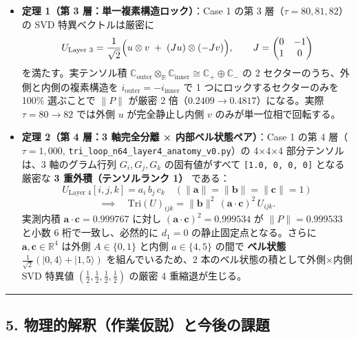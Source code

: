 \documentclass[
  a4paper,
]{ltjsarticle}
\providecommand{\tightlist}{%
  \setlength{\itemsep}{0pt}\setlength{\parskip}{0pt}}
\begin{document}
\begin{itemize}
\tightlist
\item
  \textbf{定理 1（第 3 層：単一複素構造ロック）}：Case 1 の第 3
  層（\(\tau = 80, 81, 82\)）の SVD 特異ベクトルは厳密に
  \[U_{\text{Layer 3}} = \frac{1}{\sqrt{2}}\Bigl( u \otimes v \;+\; (J u) \otimes (-J v) \Bigr), \qquad J = \begin{pmatrix} 0 & -1 \\ 1 & 0 \end{pmatrix}\]
  を満たす。実テンソル積
  \(\mathbb{C}_{\mathrm{outer}} \otimes_{\mathbb{R}} \mathbb{C}_{\mathrm{inner}} \cong \mathbb{C}_{+} \oplus \mathbb{C}_{-}\)
  の 2 セクターのうち、外側と内側の複素構造を
  \(i_{\mathrm{outer}} = -i_{\mathrm{inner}}\) で 1
  つにロックするセクターのみを 100\% 選ぶことで \(\|P\|\) が厳密 2
  倍（\(0.2409 \to 0.4817\)）になる。実際 \(\tau = 80 \to 82\) では外側
  \(u\) が完全静止し内側 \(v\) のみが単一位相で回転する。
\item
  \textbf{定理 2（第 4 層：3 軸完全分離 × 内部ベル状態ペア）}：Case 1
  の第 4 層（\(\tau = 1,000\),
  \texttt{tri\_\allowbreak{}loop\_\allowbreak{}n64\_\allowbreak{}layer4\_\allowbreak{}anatomy\_\allowbreak{}v0.py}）の 4×4×4
  部分テンソルは、3 軸のグラム行列 \(G_i, G_j, G_k\) の固有値がすべて
  \texttt{{[}1.0,\ 0,\ 0,\ 0{]}} となる厳密な \textbf{3
  重外積（テンソルランク 1）} である：
  \[U_{\text{Layer 4}}[i, j, k] = a_i \, b_j \, c_k \quad (\|\mathbf{a}\|=\|\mathbf{b}\|=\|\mathbf{c}\|=1)\]
  \[\implies \quad \mathrm{Tri}(U)_{ijk} = \|\mathbf{b}\|^2\,(\mathbf{a}\cdot\mathbf{c})^2\, U_{ijk}.\]
  実測内積 \(\mathbf{a}\cdot\mathbf{c} = 0.999767\) に対し
  \((\mathbf{a}\cdot\mathbf{c})^2 = 0.999534\) が \(\|P\| = 0.999533\)
  と小数 6 桁で一致し、必然的に \(d_1 = 0\) の静止固定点となる。さらに
  \(\mathbf{a}, \mathbf{c} \in \mathbb{R}^4\) は外側 \(A\in\{0,1\}\)
  と内側 \(a\in\{4,5\}\) の間で \textbf{ベル状態
  \(\frac{1}{\sqrt{2}}(|0,4\rangle + |1,5\rangle)\)} を組んでいるため、2
  本のベル状態の積として外側×内側 SVD 特異値
  \(\left(\frac{1}{2}, \frac{1}{2}, \frac{1}{2}, \frac{1}{2}\right)\)
  の厳密 4 重縮退が生じる。
\end{itemize}

\begin{center}\rule{0.5\linewidth}{0.5pt}\end{center}

\subsection{5.
物理的解釈（作業仮説）と今後の課題}\label{ux7269ux7406ux7684ux89e3ux91c8ux4f5cux696dux4eeeux8aacux3068ux4ecaux5f8cux306eux8ab2ux984c}
\end{document}
